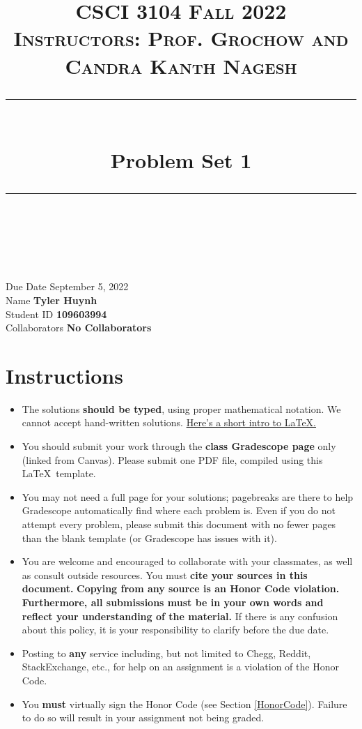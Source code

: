 \documentclass[11pt]{article}
\title{
\normalfont \normalsize 
\textsc{CSCI 3104 Fall 2022 \\ 
Instructors: Prof. Grochow and Candra Kanth Nagesh} \\
[10pt] 
\rule{\linewidth}{0.5pt} \\[6pt] 
\huge Problem Set 1 \\
\rule{\linewidth}{2pt}  \\[10pt]
}
\date{}
\theoremstyle{definition}
\theoremstyle{definition}
\theoremstyle{definition}
\begin{document}
\maketitle


\noindent
Due Date \dotfill September 5, 2022  \\
Name \dotfill \textbf{Tyler Huynh} \\
Student ID \dotfill \textbf{109603994} \\
Collaborators \dotfill \textbf{No Collaborators}

\tableofcontents

\section*{Instructions}
 \begin{itemize}
	\item The solutions \textbf{should be typed}, using proper mathematical notation. We cannot accept hand-written solutions. \href{http://ece.uprm.edu/~caceros/latex/introduction.pdf}{Here's a short intro to \LaTeX.}
	\item You should submit your work through the \textbf{class Gradescope page} only (linked from Canvas). Please submit one PDF file, compiled using this \LaTeX \ template.
	\item You may not need a full page for your solutions; pagebreaks are there to help Gradescope automatically find where each problem is. Even if you do not attempt every problem, please submit this document with no fewer pages than the blank template (or Gradescope has issues with it).

	\item You are welcome and encouraged to collaborate with your classmates, as well as consult outside resources. You must \textbf{cite your sources in this document.} \textbf{Copying from any source is an Honor Code violation. Furthermore, all submissions must be in your own words and reflect your understanding of the material.} If there is any confusion about this policy, it is your responsibility to clarify before the due date. 

	\item Posting to \textbf{any} service including, but not limited to Chegg, Reddit, StackExchange, etc., for help on an assignment is a violation of the Honor Code.

	\item You \textbf{must} virtually sign the Honor Code (see Section \ref{HonorCode}). Failure to do so will result in your assignment not being graded.
\end{itemize}
\end{document}
